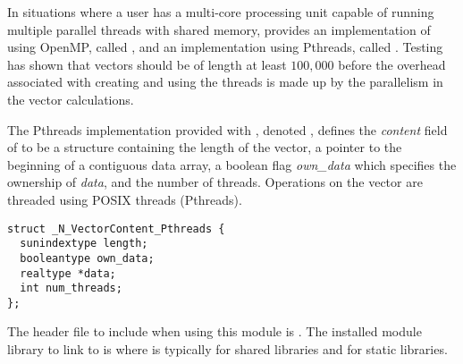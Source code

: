 
In situations where a user has a multi-core processing unit capable of
running multiple parallel threads with shared memory, {\sundials} provides
an implementation of {\nvector} using OpenMP, called {\nvecopenmp}, and
an implementation using Pthreads, called {\nvecpthreads}.  
Testing has shown that vectors should be of length at least $100,000$ 
before the overhead associated with creating and using the threads is
made up by the parallelism in the vector calculations. 

The Pthreads {\nvector} implementation provided with {\sundials}, denoted
{\nvecpthreads}, defines the {\em content} field of  to be a structure 
containing the length of the vector, a pointer to the beginning of a contiguous 
data array, a boolean flag {\em own\_data} which specifies the ownership 
of {\em data}, and the number of threads.  
Operations on the vector are threaded using POSIX threads 
(Pthreads).
\begin{verbatim} 
struct _N_VectorContent_Pthreads {
  sunindextype length;
  booleantype own_data;
  realtype *data;
  int num_threads;
};
\end{verbatim}

The header file to include when using this module is .
The installed module library to link to is
where  is typically  for shared libraries and 
for static libraries.

